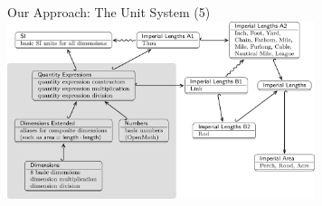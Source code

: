 \documentclass{beamer}
\begin{document}
  \begin{frame}{Our Approach: The Unit System (5)}
    \includegraphics[width=90mm]{imgs/graph1.png}
  \end{frame}
\end{document}
